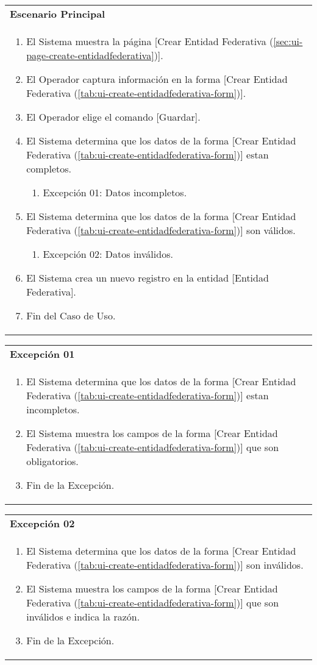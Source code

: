 \begin{tabular}{ p{15.5cm} }
	\textbf{Escenario Principal} \\
	\begin{enumerate}
		\item El Sistema muestra la página [Crear Entidad Federativa (\ref{sec:ui-page-create-entidadfederativa})].
		\item El Operador captura información en la forma [Crear Entidad Federativa (\ref{tab:ui-create-entidadfederativa-form})].
		\item El Operador elige el comando [Guardar].
		\item El Sistema determina que los datos de la forma [Crear Entidad Federativa (\ref{tab:ui-create-entidadfederativa-form})] estan completos.
			\begin{enumerate}
				\item Excepción 01: Datos incompletos.
			\end{enumerate}
		\item El Sistema determina que los datos de la forma [Crear Entidad Federativa (\ref{tab:ui-create-entidadfederativa-form})] son válidos.
			\begin{enumerate}
				\item Excepción 02: Datos inválidos.
			\end{enumerate}
		\item El Sistema crea un nuevo registro en la entidad [Entidad Federativa].
		\item Fin del Caso de Uso.
	\end{enumerate}
\end{tabular}

\begin{tabular}{ p{15.5cm} }
	\textbf{Excepción 01} \\
	\begin{enumerate}
		\item El Sistema determina que los datos de la forma [Crear Entidad Federativa (\ref{tab:ui-create-entidadfederativa-form})] estan incompletos.
		\item El Sistema muestra los campos de la forma [Crear Entidad Federativa (\ref{tab:ui-create-entidadfederativa-form})] que son obligatorios.
		\item Fin de la Excepción.
	\end{enumerate}
\end{tabular}

\begin{tabular}{ p{15.5cm} }
	\textbf{Excepción 02} \\
	\begin{enumerate}
		\item El Sistema determina que los datos de la forma [Crear Entidad Federativa (\ref{tab:ui-create-entidadfederativa-form})] son inválidos.
		\item El Sistema muestra los campos de la forma [Crear Entidad Federativa (\ref{tab:ui-create-entidadfederativa-form})] que son inválidos e indica la razón.
		\item Fin de la Excepción.
	\end{enumerate}
\end{tabular}


